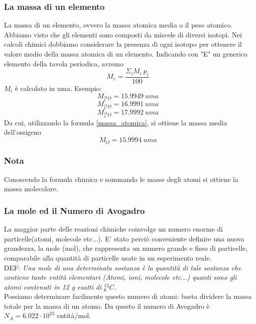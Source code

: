 \documentclass{article}
\begin{document}
\subsubsection{La massa di un elemento}
\qquad La massa di un elemento, ovvero la massa atomica media o il peso atomico.\\
Abbiamo visto che gli elementi sono composti da miscele di diversi isotopi. Nei calcoli chimici
dobbiamo considerare la presenza di ogni isotopo per ottenere il valore medio della massa atomica di un 
elemento. Indicando con "E" un generico elemento della tavola periodica, avremo 
\begin{equation}\label{massa_atomica}M_e= \frac{\Sigma _i M_i \ p_i}{100}\end{equation}
$M_i$ è calcolato in uma.
Esempio:
\[M_{^{16}_8O}=15.9949 \ uma \]
\[M_{^{17}_8O}=16.9991 \ uma \]
\[M_{^{18}_8O}=17.9992 \ uma \]
Da cui, utilizzando la formula \eqref{massa_atomica}, si ottiene la massa media dell'ossigeno
\[M_{O}=15.9994 \ uma \]
\subsubsection*{Nota}
Conoscendo la formula chimica e sommando le masse degli atomi si ottiene la massa molecolare.
\subsubsection{La mole ed il Numero di Avogadro}
La maggior parte delle reazioni chimiche coinvolge un numero enorme di particelle(atomi, molecole etc...).
E' stato perciò conveniente definire una nuova grandezza, la mole (mol), che rappresenta un numero grande e 
fisso di particelle, comparabile alla quantità di particelle usate in un esperimento reale.\\
DEF: \textit{Una mole di una determinata sostanza è la quantità di tale sostanza che contiene tante
entità elementari (Atomi, ioni, molecole etc...) quanti sono gli atomi contenuti in 12 g esatti di $^{12}_6C$.}\\ 
Possiamo determinare facilmente questo numero di atomi: basta dividere la massa totale per la massa di un atomo.
Da questo il numero di Avogadro è
\\ $N_A = 6.022\cdot 10^{23}$ entità/mol.\\
\end{document}
